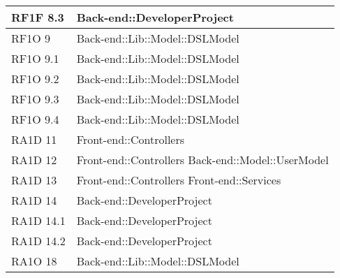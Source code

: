 \begin{center}
\begin{longtable}{|p{3cm}|p{7cm}|}
      RF1F 8.3 & Back-end::DeveloperProject \\ \hline
      RF1O 9 & Back-end::Lib::Model::DSLModel \\ \hline
      RF1O 9.1 & Back-end::Lib::Model::DSLModel \\ \hline
      RF1O 9.2 & Back-end::Lib::Model::DSLModel \\ \hline
      RF1O 9.3 & Back-end::Lib::Model::DSLModel \\ \hline
      RF1O 9.4 & Back-end::Lib::Model::DSLModel \\ \hline
      RA1D 11 & Front-end::Controllers \\ \hline
      RA1D 12 & Front-end::Controllers \newline     
      			Back-end::Model::UserModel \\ \hline
      RA1D 13 & Front-end::Controllers \newline
      			Front-end::Services \\ \hline
      RA1D 14 &	Back-end::DeveloperProject \\ \hline
      RA1D 14.1 & Back-end::DeveloperProject \\ \hline
      RA1D 14.2 & Back-end::DeveloperProject \\ \hline
      RA1O 18 & Back-end::Lib::Model::DSLModel \\ \hline
		      
       \end{longtable}
      \egroup
      \end{center}  
\clearpage